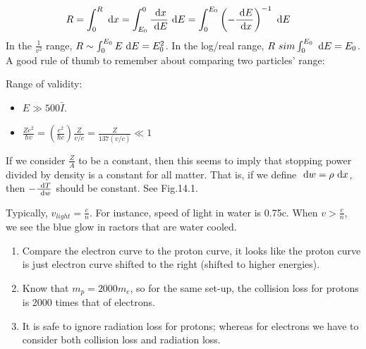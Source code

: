 \documentclass{school-22.101-notes}
\begin{document}
\begin{align}
    R &= \int_0^R \mbox{ }\mathrm{d} x = \int_{E_0}^0 \frac{\mbox{ }\mathrm{d} x}{\mbox{ }\mathrm{d} E} \mbox{ }\mathrm{d} E = \int_0^{E_0} \left( - \frac{\mbox{ }\mathrm{d} E}{\mbox{ }\mathrm{d} x} \right)^{-1} \mbox{ }\mathrm{d} E 
\end{align}
In the $\frac{1}{v^2}$ range, $R \sim \int_0^{E_0} E \mbox{ }\mathrm{d} E = E_0^2$. 
In the log/real range, $R\ sim \int_0^{E_0} \mbox{ }\mathrm{d} E  = E_0$. 
A good rule of thumb to remember about comparing two particles' range:

Range of validity:
\begin{itemize}
    \item $E \gg 500 \bar{I}$. 
    \item $\frac{Z e^2}{\hbar v} = \left( \frac{e^2}{\hbar c} \right) \frac{Z}{v/c} = \frac{Z}{137 (v/c) } \ll 1 $
\end{itemize}



If we consider $\frac{Z}{A}$ to be a constant, then this seems to imply that stopping power divided by density is a constant for all matter. That is, if we define $\mbox{ }\mathrm{d} w = \rho \mbox{ }\mathrm{d} x$, then $-\frac{\mbox{ }\mathrm{d} T}{\mbox{ }\mathrm{d} w}$ should be constant. See Fig.14.1. 


Typically, $v_{light} = \frac{c}{n}.$ For instance, speed of light in water is 0.75c. When $v> \frac{c}{n}$, we see the blue glow in ractors that are water cooled. 



\begin{enumerate}
\item Compare the electron curve to the proton curve, it looks like the proton curve is just electron curve shifted to the right (shifted to higher energies). 
\item Know that $m_p = 2000 m_e$, so for the same set-up, the collision loss for protons is 2000 times that of electrons. 
\item It is safe to ignore radiation loss for protons; whereas for electrons we have to consider both collision loss and radiation loss. 
\end{enumerate}
\end{document}
